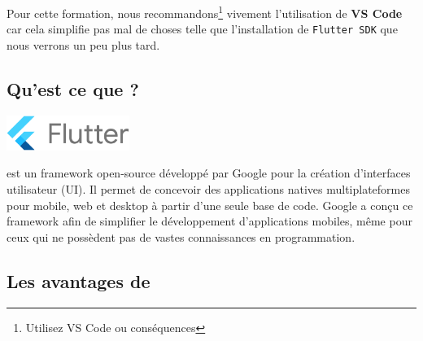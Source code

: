 Pour cette formation, nous recommandons\footnote{Utilisez VS Code ou conséquences \cat{}} vivement l'utilisation de \textbf{VS Code} car cela simplifie pas mal de choses telle que l'installation de \texttt{Flutter SDK} que nous verrons un peu plus tard.

\newpage
\subsection{Qu'est ce que \flutter{} ? }

\begin{floatingfigure}[r]{0.25\textwidth}
  \centering
  \includegraphics[width=0.3\textwidth]{Images_formation/FlutterLogo.png}
\end{floatingfigure}

\par \flutter{} est un framework open-source développé par Google pour la création d'interfaces utilisateur (UI). Il permet de concevoir des applications natives multiplateformes pour mobile, web et desktop à partir d'une seule base de code. Google a  conçu ce framework afin de simplifier le développement d'applications mobiles, même pour ceux qui ne possèdent pas de vastes connaissances en programmation.

\subsection{Les avantages de \flutter{}}

